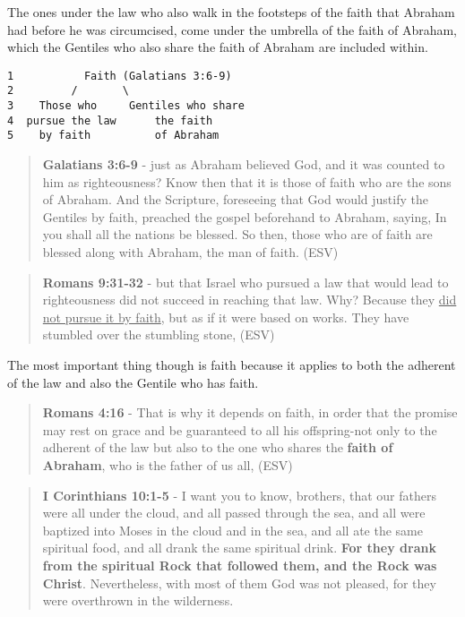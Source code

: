 \documentclass[11pt]{article}
\begin{document}
The ones under the law who also walk in the footsteps of the faith that Abraham had before he was circumcised, come under the umbrella of the faith of Abraham, which the Gentiles who also share the faith of Abraham are included within.

\begin{verbatim}
1           Faith (Galatians 3:6-9)
2         /       \
3    Those who     Gentiles who share
4  pursue the law      the faith
5    by faith          of Abraham
\end{verbatim}

\begin{quote}
\textbf{Galatians 3:6-9} -  just as Abraham believed God, and it was counted to him as righteousness?  Know then that it is those of faith who are the sons of Abraham.  And the Scripture, foreseeing that God would justify the Gentiles by faith, preached the gospel beforehand to Abraham, saying, In you shall all the nations be blessed.  So then, those who are of faith are blessed along with Abraham, the man of faith.  (ESV)
\end{quote}

\begin{quote}
\textbf{Romans 9:31-32} - but that Israel who pursued a law that would lead to righteousness did not succeed in reaching that law. Why? Because they \uline{did not pursue it by faith}, but as if it were based on works. They have stumbled over the stumbling stone, (ESV)
\end{quote}

The most important thing though is faith because it applies to both the adherent of the law and also the Gentile who has faith.

\begin{quote}
\textbf{Romans 4:16} - That is why it depends on faith, in order that the promise may rest on grace and be guaranteed to all his offspring-not only to the adherent of the law but also to the one who shares the \textbf{faith of Abraham}, who is the father of us all, (ESV)
\end{quote}

\begin{quote}
\textbf{I Corinthians 10:1-5} - I want you to know, brothers, that our fathers were all under the cloud, and all passed through the sea, and all were baptized into Moses in the cloud and in the sea, and all ate the same spiritual food, and all drank the same spiritual drink. \textbf{For they drank from the spiritual Rock that followed them, and the Rock was Christ}. Nevertheless, with most of them God was not pleased, for they were overthrown in the wilderness.
\end{quote}
\end{document}
